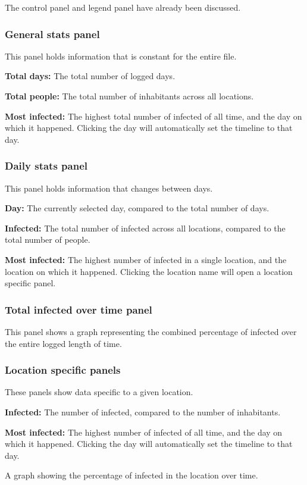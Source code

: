The control panel and legend panel have already been discussed.

\subsubsection{General stats panel}
This panel holds information that is constant for the entire file.
\begin{compactitem}	
	\item \textbf{Total days:} The total number of logged days.
	\item \textbf{Total people:} The total number of inhabitants across all locations.
	\item \textbf{Most infected:} The highest total number of infected of all time, and the day on which it happened. Clicking the day will automatically set the timeline to that day.
\end{compactitem}


\subsubsection{Daily stats panel}
This panel holds information that changes between days.
\begin{compactitem}	
	\item \textbf{Day:} The currently selected day, compared to the total number of days.
	\item \textbf{Infected:} The total number of infected across all locations, compared to the total number of people.
	\item \textbf{Most infected:} The highest number of infected in a single location, and the location on which it happened. Clicking the location name will open a location specific panel.
\end{compactitem}

\subsubsection{Total infected over time panel}
This panel shows a graph representing the combined percentage of infected over the entire logged length of time.

\subsubsection{Location specific panels}
These panels show data specific to a given location.
\begin{compactitem}	
	\item \textbf{Infected:} The number of infected, compared to the number of inhabitants.
	\item \textbf{Most infected:} The highest number of infected of all time, and the day on which it happened. Clicking the day will automatically set the timeline to that day.
	\item A graph showing the percentage of infected in the location over time.
\end{compactitem}